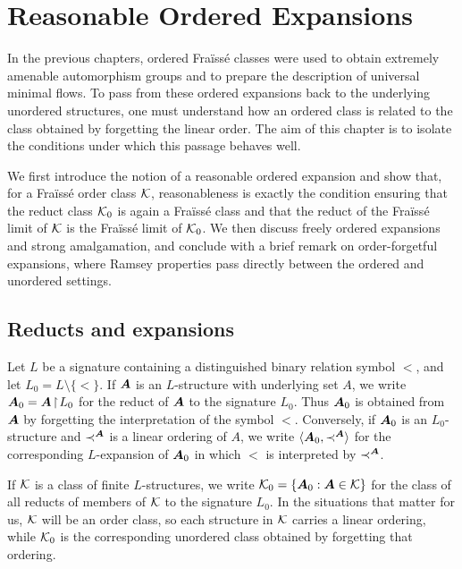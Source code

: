 \chapter{Reasonable Ordered Expansions}
\label{chap:reasonable-expansions}

In the previous chapters, ordered Fraïssé classes were used to obtain extremely amenable automorphism groups and to prepare the description of universal minimal flows. To pass from these ordered expansions back to the underlying unordered structures, one must understand how an ordered class is related to the class obtained by forgetting the linear order. The aim of this chapter is to isolate the conditions under which this passage behaves well.

We first introduce the notion of a reasonable ordered expansion and show that, for a Fraïssé order class \(\mathcal{K}\), reasonableness is exactly the condition ensuring that the reduct class \(\mathcal{K}_0\) is again a Fraïssé class and that the reduct of the Fraïssé limit of \(\mathcal{K}\) is the Fraïssé limit of \(\mathcal{K}_0\). We then discuss freely ordered expansions and strong amalgamation, and conclude with a brief remark on order-forgetful expansions, where Ramsey properties pass directly between the ordered and unordered settings.

\section{Reducts and expansions}

Let \(L\) be a signature containing a distinguished binary relation symbol \(<\), and let \(L_0=L\setminus\{<\}\). If \(\boldsymbol{A}\) is an \(L\)-structure with underlying set \(A\), we write \(\boldsymbol{A}_0=\boldsymbol{A}\!\restriction\!L_0\) for the reduct of \(\boldsymbol{A}\) to the signature \(L_0\). Thus \(\boldsymbol{A}_0\) is obtained from \(\boldsymbol{A}\) by forgetting the interpretation of the symbol \(<\). Conversely, if \(\boldsymbol{A}_0\) is an \(L_0\)-structure and \(\prec^{\boldsymbol{A}}\) is a linear ordering of \(A\), we write \(\langle \boldsymbol{A}_0,\prec^{\boldsymbol{A}}\rangle\) for the corresponding \(L\)-expansion of \(\boldsymbol{A}_0\) in which \(<\) is interpreted by \(\prec^{\boldsymbol{A}}\).

If \(\mathcal{K}\) is a class of finite \(L\)-structures, we write \(\mathcal{K}_0=\{\boldsymbol{A}_0 : \boldsymbol{A}\in\mathcal{K}\}\) for the class of all reducts of members of \(\mathcal{K}\) to the signature \(L_0\). In the situations that matter for us, \(\mathcal{K}\) will be an order class, so each structure in \(\mathcal{K}\) carries a linear ordering, while \(\mathcal{K}_0\) is the corresponding unordered class obtained by forgetting that ordering.


